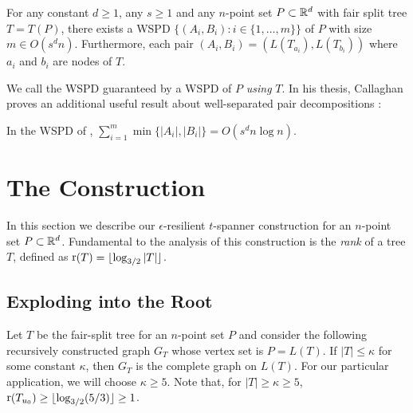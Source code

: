 \documentclass{patmorin}
\DeclareMathOperator{\rank}{r}
\begin{document}
\begin{thm}
  For any constant $d\ge 1$, any $s\ge 1$ and any $n$-point set
  $P\subset\mathbb{R}^d$ with fair split tree $T=T(P)$, there exists a WSPD
  $\{(A_i,B_i):i\in\{1,\ldots,m\}\}$ of $P$ with size $m\in O(s^d n)$.
  Furthermore, each pair $(A_i,B_i)=(L(T_{a_i}),L(T_{b_i}))$ where $a_i$
  and $b_i$ are nodes of $T$.
\end{thm}
We call the WSPD guaranteed by  a WSPD of $P$ \emph{using}
$T$.  In his thesis, Callaghan proves an additional useful result about
well-separated pair decompositions \cite[Section~4.5]{callahan:dealing}:

\begin{lem}[Callaghan 1995]
  In the WSPD of ,
   $\sum_{i=1}^m\min\{|A_i|,|B_i|\} = O(s^d n\log n)$.
\end{lem}


\section{The Construction}

In this section we describe our $\epsilon$-resilient $t$-spanner
construction for an $n$-point set $P\subset\mathbb{R}^d$.  Fundamental to the
analysis of this construction is the \emph{rank} of a tree $T$, defined
as $\rank(T)=\floor{\log_{3/2}|T|}$.

\subsection{Exploding into the Root}

Let $T$ be the fair-split tree for an $n$-point set $P$ and consider
the following recursively constructed graph $G_{T}$ whose vertex set
is $P=L(T)$.  If $|T| \le \kappa$ for some constant $\kappa$, then $G_T$
is the complete graph on $L(T)$. For our particular application, we will choose $\kappa\ge 5$.  Note that, for $|T|\ge\kappa\ge 5$, $\rank(T_{u_0}) \ge \floor{\log_{3/2}(5/3)} \ge 1$.
\end{document}
